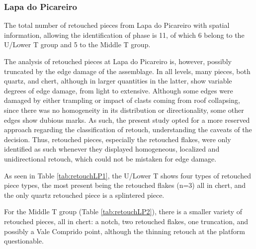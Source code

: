 \documentclass[12pt,twoside]{reedthesis}
\begin{document}
\newpage

\hypertarget{lapa-do-picareiro-7}{%
\subsubsection{Lapa do Picareiro}\label{lapa-do-picareiro-7}}

The total number of retouched pieces from Lapa do Picareiro with spatial information, allowing the identification of phase is 11, of which 6 belong to the U/Lower T group and 5 to the Middle T group.

The analysis of retouched pieces at Lapa do Picareiro is, however, possibly truncated by the edge damage of the assemblage. In all levels, many pieces, both quartz, and chert, although in larger quantities in the latter, show variable degrees of edge damage, from light to extensive. Although some edges were damaged by either trampling or impact of clasts coming from roof collapsing, since there was no homogeneity in its distribution or directionality, some other edges show dubious marks. As such, the present study opted for a more reserved approach regarding the classification of retouch, understanding the caveats of the decision. Thus, retouched pieces, especially the retouched flakes, were only identified as such whenever they displayed homogeneous, localized and unidirectional retouch, which could not be mistaken for edge damage.

As seen in Table \ref{tab:retouchLP1}, the U/Lower T shows four types of retouched piece types, the most present being the retouched flakes (n=3) all in chert, and the only quartz retouched piece is a splintered piece.

For the Middle T group (Table \ref{tab:retouchLP2}), there is a smaller variety of retouched pieces, all in chert: a notch, two retouched flakes, one truncation, and possibly a Vale Comprido point, although the thinning retouch at the platform questionable.
\end{document}
